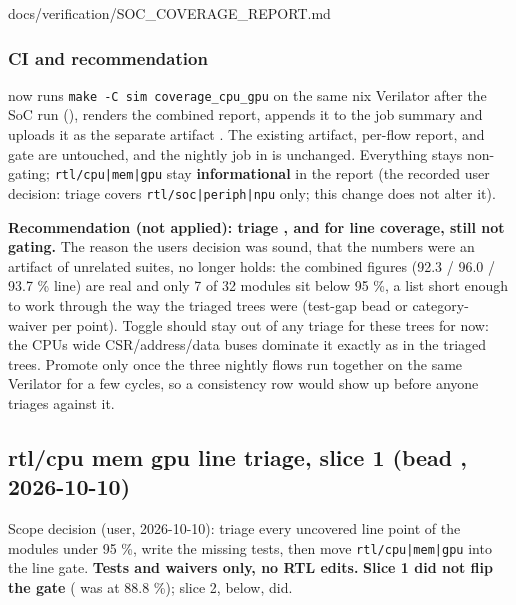 \begin{relocated}{docs/verification/SOC_COVERAGE_REPORT.md}
\subsubsection{CI and recommendation}\label{tm:flow:soc-coverage-report:ci-and-recommendation}

 now runs
\texttt{make\ -\allowbreak{}C\ sim\ coverage\_\allowbreak{}cpu\_\allowbreak{}gpu}
on the same nix Verilator after the SoC run (),
renders the combined report, appends it to the job summary and uploads
it as the separate artifact . The existing
 artifact, per-flow report,  and
gate are untouched, and the nightly  job in
 is unchanged. Everything stays non-gating;
\texttt{rtl/\allowbreak{}cpu|mem|gpu} stay \textbf{informational} in the
report (the recorded user decision: triage covers
\texttt{rtl/\allowbreak{}soc|periph|npu} only; this change does not
alter it).

\textbf{Recommendation (not applied): triage ,
 and  for line coverage, still not gating.}
The reason the user\textquotesingle s decision was sound, that the
numbers were an artifact of unrelated suites, no longer holds: the
combined figures (92.3 / 96.0 / 93.7 \% line) are real and only 7 of 32
modules sit below 95 \%, a list short enough to work through the way the
triaged trees were (test-gap bead or category- waiver per
point). Toggle should stay out of any triage for these trees for now:
the CPU\textquotesingle s wide
CSR/\allowbreak{}address/\allowbreak{}data buses dominate it exactly as
in the triaged trees. Promote only once the three nightly flows run
together on the same Verilator for a few cycles, so a 
consistency row would show up before anyone triages against it.

\subsection{\texorpdfstring{rtl/cpu \textbar{} mem \textbar{} gpu line
triage, slice 1 (bead ,
2026-10-10)}{rtl/cpu \textbar{} mem \textbar{} gpu line triage, slice 1 (bead , 2026-10-10)}}\label{tm:flow:soc-coverage-report:rtlcpu-mem-gpu-line-triage-slice-1-bead-a5ze-2026-10-10}

Scope decision (user, 2026-10-10): triage every uncovered line point of
the modules under 95 \%, write the missing tests, then move
\texttt{rtl/\allowbreak{}cpu|mem|gpu} into the line gate. \textbf{Tests
and waivers only, no RTL edits.} \textbf{Slice 1 did not flip the gate}
( was at 88.8 \%); slice 2, below, did.


\end{relocated}
